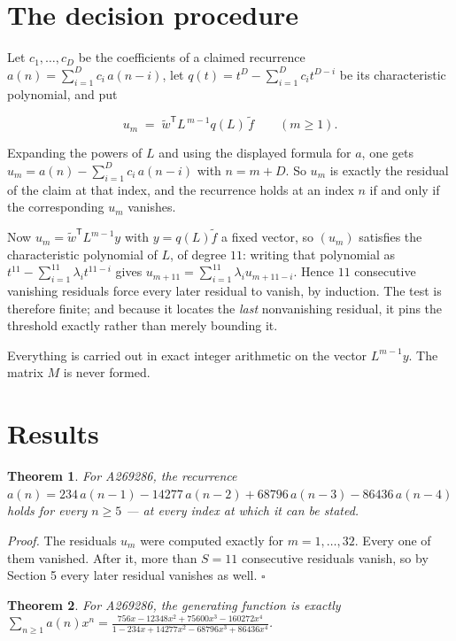 \documentclass[11pt]{article}
\newtheorem{theorem}{Theorem}
\theoremstyle{definition}
\begin{document}
\section{The decision procedure}

Let $c_1,\dots,c_D$ be the coefficients of a claimed recurrence $a(n) = \sum_{i=1}^{D} c_i\,a(n-i)$, let $q(t) = t^{D} - \sum_{i=1}^{D} c_i t^{D-i}$ be its characteristic polynomial, and put

\[u_m \;=\; \tilde w^{\mathsf T} L^{\,m-1} q(L)\,\tilde f \qquad (m \ge 1).\]

Expanding the powers of $L$ and using the displayed formula for $a$, one gets $u_m = a(n) - \sum_{i=1}^{D} c_i\,a(n-i)$ with $n = m + D$. So $u_m$ is exactly the residual of the claim at that index, and the recurrence holds at an index $n$ if and only if the corresponding $u_m$ vanishes.

Now $u_m = \tilde w^{\mathsf T} L^{m-1} y$ with $y = q(L)\tilde f$ a fixed vector, so $(u_m)$ satisfies the characteristic polynomial of $L$, of degree $11$: writing that polynomial as $t^{11} - \sum_{i=1}^{11} \lambda_i t^{11-i}$ gives $u_{m+11} = \sum_{i=1}^{11} \lambda_i u_{m+11-i}$. Hence $11$ consecutive vanishing residuals force every later residual to vanish, by induction. The test is therefore finite; and because it locates the {\itshape last} nonvanishing residual, it pins the threshold exactly rather than merely bounding it.

Everything is carried out in exact integer arithmetic on the vector $L^{m-1}y$. The matrix $M$ is never formed.

\section{Results}

\begin{theorem} For A269286, the recurrence $a(n) = 234\,a(n-1) - 14277\,a(n-2) + 68796\,a(n-3) - 86436\,a(n-4)$ holds for every $n \ge 5$ --- at every index at which it can be stated.\end{theorem}

{\itshape Proof.} The residuals $u_m$ were computed exactly for $m = 1,\dots,32$. Every one of them vanished. After it, more than $S = 11$ consecutive residuals vanish, so by Section 5 every later residual vanishes as well. $\square$

\begin{theorem} For A269286, the generating function is exactly $\sum_{n\ge 1} a(n)x^n = \frac{756x - 12348x^{2} + 75600x^{3} - 160272x^{4}}{1 - 234x + 14277x^{2} - 68796x^{3} + 86436x^{4}}$.\end{theorem}
\end{document}
